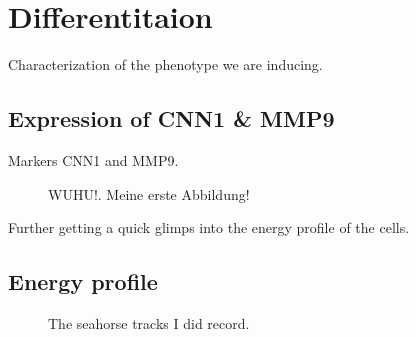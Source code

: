 \section{Differentitaion}
\label{sec:differentiation}

Characterization of the phenotype we are inducing.

    \subsection{Expression of CNN1 \& MMP9}

    Markers CNN1 and MMP9.

    \label{subsec:qPCR}
    \begin{figure}[htbp]
    \capstart
        \centering
    	

    	\begin{minipage}{\captionwidth}
    		\caption[CNN_qPCR]{ \newline WUHU!. Meine erste Abbildung!}
    		\label{fig:qPCR}
    	\end{minipage}
    \end{figure}

    Further getting a quick glimps into the energy profile of the cells.

    \subsection{Energy profile}
    \label{subsec:energy}
    \begin{figure}[htbp]
    \capstart
        \centering
    	

    	\begin{minipage}{\captionwidth}
    		\caption[seahorse_tracks]{ \newline The seahorse tracks I did record.}
    		\label{fig:energy_profile}
    	\end{minipage}
    \end{figure}


